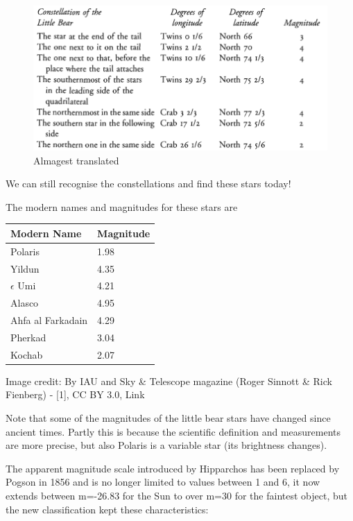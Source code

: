 \documentclass[
  letterpaper,
  DIV=11,
  numbers=noendperiod]{scrreprt}
\begin{document}
\begin{figure}

{\centering \includegraphics{img/AlmagestTranslation.png}

}

\caption{Almagest translated}

\end{figure}

We can still recognise the constellations and find these stars today!

The modern names and magnitudes for these stars are

\begin{longtable}[]{@{}ll@{}}
\toprule\noalign{}
Modern Name & Magnitude \\
\midrule\noalign{}
\endhead
\bottomrule\noalign{}
\endlastfoot
Polaris & 1.98 \\
Yildun & 4.35 \\
\(\epsilon\) Umi & 4.21 \\
Alasco & 4.95 \\
Ahfa al Farkadain & 4.29 \\
Pherkad & 3.04 \\
Kochab & 2.07 \\
\end{longtable}

Image credit: By IAU and Sky \& Telescope magazine (Roger Sinnott \&
Rick Fienberg) - {[}1{]}, CC BY 3.0, Link

Note that some of the magnitudes of the little bear stars have changed
since ancient times. Partly this is because the scientific definition
and measurements are more precise, but also Polaris is a variable star
(its brightness changes).

The apparent magnitude scale introduced by Hipparchos has been replaced
by Pogson in 1856 and is no longer limited to values between 1 and 6, it
now extends between m=-26.83 for the Sun to over m=30 for the faintest
object, but the new classification kept these characteristics:
\end{document}
